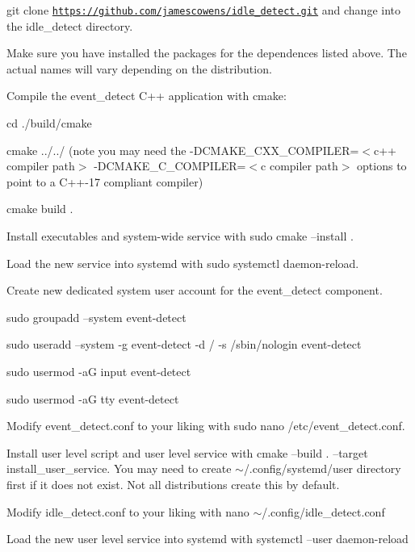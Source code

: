 \begin{DoxyEnumerate}
\item git clone \href{https://github.com/jamescowens/idle_detect.git}{\tt https\+://github.\+com/jamescowens/idle\+\_\+detect.\+git} and change into the idle\+\_\+detect directory.
\item Make sure you have installed the packages for the dependences listed above. The actual names will vary depending on the distribution.
\item Compile the event\+\_\+detect C++ application with cmake\+:
\begin{DoxyItemize}
\item cd ./build/cmake
\item cmake ../../ (note you may need the -\/\+D\+C\+M\+A\+K\+E\+\_\+\+C\+X\+X\+\_\+\+C\+O\+M\+P\+I\+L\+ER=$<$c++ compiler path$>$ -\/\+D\+C\+M\+A\+K\+E\+\_\+\+C\+\_\+\+C\+O\+M\+P\+I\+L\+ER=$<$c compiler path$>$ options to point to a C++-\/17 compliant compiler)
\item cmake build .
\end{DoxyItemize}
\item Install executables and system-\/wide service with sudo cmake --install .
\item Load the new service into systemd with sudo systemctl daemon-\/reload.
\item Create new dedicated system user account for the event\+\_\+detect component.
\begin{DoxyItemize}
\item sudo groupadd --system event-\/detect
\item sudo useradd --system -\/g event-\/detect -\/d / -\/s /sbin/nologin event-\/detect
\item sudo usermod -\/aG input event-\/detect
\item sudo usermod -\/aG tty event-\/detect
\end{DoxyItemize}
\item Modify event\+\_\+detect.\+conf to your liking with sudo nano /etc/event\+\_\+detect.conf.
\item Install user level script and user level service with cmake --build . --target install\+\_\+user\+\_\+service. You may need to create $\sim$/.config/systemd/user directory first if it does not exist. Not all distributions create this by default.
\item Modify idle\+\_\+detect.\+conf to your liking with nano $\sim$/.config/idle\+\_\+detect.\+conf
\item Load the new user level service into systemd with systemctl --user daemon-\/reload

\end{DoxyEnumerate}
